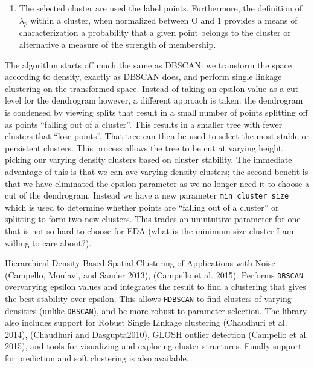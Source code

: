 \documentclass[fleqn,usenatbib]{mnras}
\begin{document}
{\begin{enumerate}
\item The selected cluster are used the label points. Furthermore, the definition
  of $\lambda_p$ within a cluster, when normalized between O and 1 provides a means
  of characterization a probability that a given point belongs to the cluster or
  alternative a measure of the strength of membership. 
  
\end{enumerate}

The algorithm starts off much the same as DBSCAN: we transform the space
according to density, exactly as DBSCAN does, and perform single linkage
clustering on the transformed space. Instead of taking an epsilon value
as a cut level for the dendrogram however, a different approach is taken:
the dendrogram is condensed by viewing splits that result in a small number
of points splitting off as points ``falling out of a cluster''. This results
in a smaller tree with fewer clusters that ``lose points''. That tree can then
be used to select the most stable or persistent clusters. This process allows
the tree to be cut at varying height, picking our varying density clusters
based on cluster stability. The immediate advantage of this is that we can
ave varying density clusters; the second benefit is that we have eliminated
the epsilon parameter as we no longer need it to choose a cut of the dendrogram.
Instead we have a new parameter \texttt{min\_cluster\_size} which is used
to determine whether points are ``falling out of a cluster'' or splitting
to form two new clusters. This trades an unintuitive parameter for one that
is not so hard to choose for EDA (what is the minimum size cluster I am
willing to care about?).


Hierarchical Density-Based Spatial Clustering of Applications with Noise (Campello,
Moulavi, and Sander 2013), (Campello et al. 2015). Performs \texttt{DBSCAN} overvarying
epsilon values and integrates the result to find a clustering that gives the best
stability over epsilon. This allows \texttt{HDBSCAN} to find clusters of varying densities
(unlike \texttt{DBSCAN}), and be more robust to parameter selection. The library also
includes support for Robust Single Linkage clustering (Chaudhuri et al. 2014),
(Chaudhuri and Dasgupta2010), GLOSH outlier detection (Campello et al. 2015), and
tools for visualizing and exploring cluster structures. Finally support for prediction
and soft clustering is also available.

}
\end{document}
